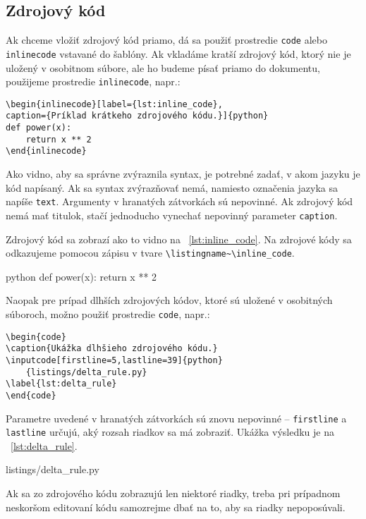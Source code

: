 \subsection{Zdrojový kód}

Ak chceme vložiť zdrojový kód priamo, dá sa použiť prostredie \texttt{code} alebo \texttt{inlinecode} vstavané do šablóny. Ak vkladáme kratší zdrojový kód, ktorý nie je uložený v osobitnom súbore, ale ho budeme písať priamo do dokumentu, použijeme prostredie \texttt{inlinecode}, napr.:
\begin{Verbatim}
\begin{inlinecode}[label={lst:inline_code},
caption={Príklad krátkeho zdrojového kódu.}]{python}
def power(x):
	return x ** 2
\end{inlinecode}
\end{Verbatim}
Ako vidno, aby sa správne zvýraznila syntax, je potrebné zadať, v akom jazyku je kód napísaný. Ak sa syntax zvýrazňovať nemá, namiesto označenia jazyka sa napíše \texttt{text}. Argumenty v hranatých zátvorkách sú nepovinné. Ak zdrojový kód nemá mať titulok, stačí jednoducho vynechať nepovinný parameter \texttt{caption}.

Zdrojový kód sa zobrazí ako to vidno na \listingname~\ref{lst:inline_code}. Na zdrojové kódy sa odkazujeme pomocou zápisu v tvare \texttt{{\textbackslash}listingname\textasciitilde{\textbackslash}inline\_code}.

\begin{inlinecode}[label={lst:inline_code},
caption={Príklad krátkeho zdrojového kódu.}]{python}
def power(x):
	return x ** 2
\end{inlinecode}
Naopak pre prípad dlhších zdrojových kódov, ktoré sú uložené v osobitných súboroch, možno použiť prostredie \texttt{code}, napr.:
\begin{Verbatim}
\begin{code}
\caption{Ukážka dlhšieho zdrojového kódu.}
\inputcode[firstline=5,lastline=39]{python}
	{listings/delta_rule.py}
\label{lst:delta_rule}
\end{code}
\end{Verbatim}

Parametre uvedené v hranatých zátvorkách sú znovu nepovinné -- \texttt{firstline} a \texttt{lastline} určujú, aký rozsah riadkov sa má zobraziť. Ukážka výsledku je na \listingname~\ref{lst:delta_rule}.
\begin{code}
\caption{Ukážka dlhšieho zdrojového kódu.}
	{listings/delta_rule.py}
\label{lst:delta_rule}
\end{code}
Ak sa zo zdrojového kódu zobrazujú len niektoré riadky, treba pri prípadnom neskoršom editovaní kódu samozrejme dbať na to, aby sa riadky nepoposúvali.


